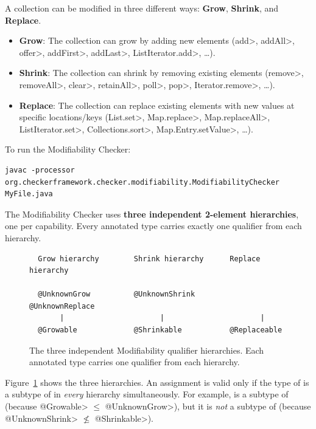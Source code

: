 A collection can be modified in three different ways:
\textbf{Grow}, \textbf{Shrink}, and \textbf{Replace}.
\begin{itemize}
    \item \textbf{Grow}: The collection can grow by adding new elements
      (\<add>, \<addAll>, \<offer>, \<addFirst>, \<addLast>, \<ListIterator.add>, \ldots).
    \item \textbf{Shrink}: The collection can shrink by removing
      existing elements (\<remove>, \<removeAll>, \<clear>, \<retainAll>, \<poll>, \<pop>, \<Iterator.remove>,  \ldots).
    \item \textbf{Replace}: The collection can replace existing
      elements with new values at specific locations/keys (\<List.set>, \<Map.replace>, \<Map.replaceAll>,
       \<ListIterator.set>,  \<Collections.sort>, \<Map.Entry.setValue>, \ldots).
\end{itemize}

To run the Modifiability Checker:

\begin{Verbatim}
javac -processor org.checkerframework.checker.modifiability.ModifiabilityChecker MyFile.java
\end{Verbatim}



The Modifiability Checker uses \textbf{three independent 2-element
hierarchies}, one per capability.  Every annotated type carries exactly
one qualifier from each hierarchy.

\begin{figure}
  \centering
  \begin{minipage}{0.85\linewidth}
\begin{verbatim}
  Grow hierarchy        Shrink hierarchy      Replace hierarchy

  @UnknownGrow          @UnknownShrink        @UnknownReplace
       |                      |                      |
  @Growable             @Shrinkable           @Replaceable
\end{verbatim}
  \end{minipage}
  \caption{The three independent Modifiability qualifier hierarchies.
    Each annotated type carries one qualifier from each hierarchy.}
  \label{fig-modifiability-lattice}
\end{figure}

Figure~\ref{fig-modifiability-lattice} shows the three hierarchies.
An assignment  is valid only if the type of  is a
subtype of  in \emph{every} hierarchy simultaneously.  For
example,  is a
subtype of 
(because \<@Growable> $\le$ \<@UnknownGrow>), but it is \emph{not} a
subtype of  (because
\<@UnknownShrink> $\not\le$ \<@Shrinkable>).

